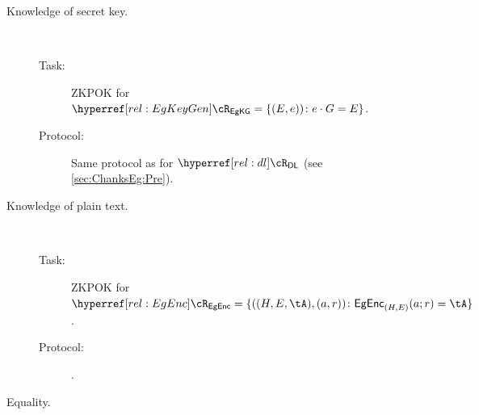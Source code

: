 \begin{description}
	\item[Knowledge of secret key.] ~
	
	
	
	\begin{description}
		\item[Task:] ZKPOK for $\rEgKeyGen = \rEgKeyGenDef$. \label{rel:EgKeyGen}
		
		\item[Protocol:] Same protocol as for $\rdl$ (see \cref{sec:ChanksEg:Pre}).
	\end{description}
	
	
	\item[Knowledge of plain text.] ~
	
	\begin{description}
		\item[Task:] ZKPOK for  $\rEgEnc=\rEgEncDef$.\label{rel:EgEnc}
		
		\item[Protocol:]   \cite[Protocol A.2]{HaitnerLNR23}.
		
		
	\end{description}
	
	
	
	
	\item[Equality.] ~

	
	

\end{description}
